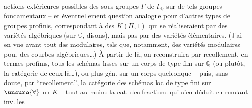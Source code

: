 actions extérieures possibles des sous-groupes $\Gamma$ de $\Gamma_{\mathbb{Q}}$ sur de tels groupes fondamentaux -- et éventuellement question analogue pour d'autres types de groupes profinis, correspondant à des $K(\Pi,1)$ qui se réaliseraient par des variétés algébriques (sur $\mathbb{C}$, disons), mais pas par des variétés élémentaires. (J'ai en vue avant tout des   modulaires, tels que, notamment, des variétés modulaires pour des courbes algébriques\ldots) À partir de là, on reconstruira par recollement, en termes profinis, tous les schémas lisses sur un corps de type fini sur $\mathbb{Q}$ (ou plutôt, la catégorie de ceux-là\ldots), ou plus gén. sur un corps quelconque -- puis, sans doute, par ``recollement'', la catégorie des schémas loc de type fini sur $\unsure{\forall}$ un $K$ -- tout au moins la cat. des fractions qui s'en déduit en  rendant inv. les
